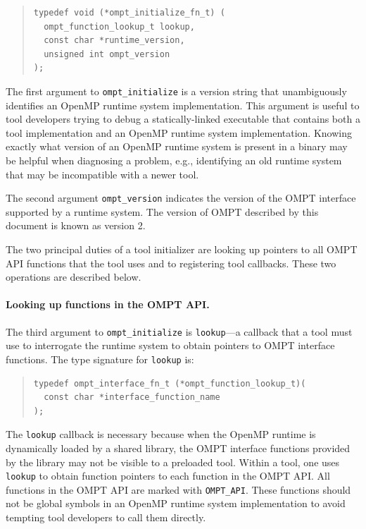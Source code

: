 \documentclass{article}
\begin{document}
\begin{quote}
\begin{verbatim}
typedef void (*ompt_initialize_fn_t) (
  ompt_function_lookup_t lookup,
  const char *runtime_version, 
  unsigned int ompt_version
);
\end{verbatim}
\end{quote}
The first argument to  \verb|ompt_initialize| is a version string that unambiguously identifies an OpenMP runtime system implementation. This argument is useful to tool developers trying to debug a statically-linked executable that contains both a tool implementation and an OpenMP runtime system implementation. Knowing exactly what version of an OpenMP runtime system is present in a binary may be helpful when diagnosing a problem, e.g., identifying an old runtime system that may be incompatible with a newer tool.

The second argument \verb|ompt_version| indicates the version of the OMPT interface supported by a runtime system.
The version of OMPT described by this document is known as version 2.

The two principal duties of a tool initializer are looking up pointers to all OMPT API functions that the tool uses and to registering tool callbacks.  These two operations are described below.

\paragraph{Looking up functions in the OMPT API.} The third argument to \verb|ompt_initialize| is \verb|lookup|---a callback that a tool must use to interrogate the runtime system to obtain pointers to OMPT interface functions.
The type signature for  \verb|lookup| is:

\begin{quote}
\begin{verbatim}
typedef ompt_interface_fn_t (*ompt_function_lookup_t)(
  const char *interface_function_name
);
\end{verbatim}
\end{quote}

\noindent
The \verb|lookup| callback is necessary because when the OpenMP runtime is dynamically loaded by a shared library, the OMPT interface functions provided by the library may not be visible to a preloaded tool. Within a tool, one uses \verb|lookup| to obtain function pointers to each function in the OMPT API.  All functions in the OMPT API are marked with \verb|OMPT_API|. These functions should not be global symbols in an OpenMP runtime system implementation to avoid tempting tool developers to call them directly. 
\end{document}
